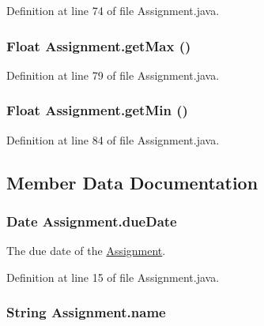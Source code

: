 Definition at line 74 of file Assignment.java.\hypertarget{classAssignment_1b84b20c7651f3ef405f88e22b4fa508}{
\subsubsection{\setlength{\rightskip}{0pt plus 5cm}Float Assignment.getMax ()}}
\label{classAssignment_1b84b20c7651f3ef405f88e22b4fa508}




Definition at line 79 of file Assignment.java.\hypertarget{classAssignment_1b65c060cc8f864ee2268d43c0eebf4f}{
\subsubsection{\setlength{\rightskip}{0pt plus 5cm}Float Assignment.getMin ()}}
\label{classAssignment_1b65c060cc8f864ee2268d43c0eebf4f}




Definition at line 84 of file Assignment.java.

\subsection{Member Data Documentation}
\hypertarget{classAssignment_d47ded463c5c705bb2d81719162a3311}{
\subsubsection{\setlength{\rightskip}{0pt plus 5cm}Date {\bf Assignment.dueDate}}}
\label{classAssignment_d47ded463c5c705bb2d81719162a3311}


The due date of the \hyperlink{classAssignment}{Assignment}. 



Definition at line 15 of file Assignment.java.\hypertarget{classAssignment_9316fddce1df1f4f469920d57f952735}{
\subsubsection{\setlength{\rightskip}{0pt plus 5cm}String {\bf Assignment.name}}}
\label{classAssignment_9316fddce1df1f4f469920d57f952735}


